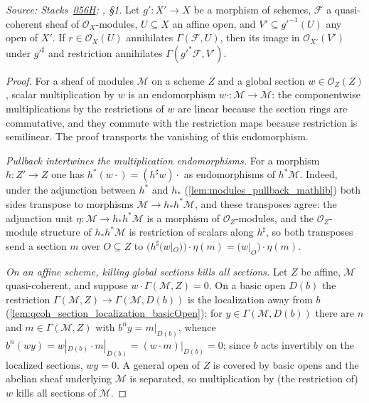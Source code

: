 \begin{lemma}\leanok
  \label{lem:annihilator_pullback_sections}
  \textit{Source:
  Stacks~\href{https://stacks.math.columbia.edu/tag/056H}{056H};
  \cite{nitsure-hilbert-quot}, \S 1.}
  Let \(g' : X' \to X\) be a morphism of schemes, \(\mathcal{F}\) a
  quasi-coherent sheaf of \(\mathcal{O}_X\)-modules, \(U \subseteq X\) an
  affine open, and \(V' \subseteq g'^{-1}(U)\) any open of \(X'\).  If
  \(r \in \mathcal{O}_X(U)\) annihilates \(\Gamma(\mathcal{F}, U)\), then its
  image in \(\mathcal{O}_{X'}(V')\) under \(g'^\sharp\) and restriction
  annihilates \(\Gamma(g'^* \mathcal{F}, V')\).
\end{lemma}
\begin{proof}\leanok
  For a sheaf of modules \(\mathcal{M}\) on a scheme \(Z\) and a global
  section \(w \in \mathcal{O}_Z(Z)\), scalar multiplication by \(w\) is an
  endomorphism \(w \cdot : \mathcal{M} \to \mathcal{M}\): the componentwise
  multiplications by the restrictions of \(w\) are linear because the section
  rings are commutative, and they commute with the restriction maps because
  restriction is semilinear.  The proof transports the vanishing of this
  endomorphism.

  \emph{Pullback intertwines the multiplication endomorphisms.}  For a
  morphism \(h : Z' \to Z\) one has \(h^*(w \cdot) = (h^\sharp w) \cdot\) as
  endomorphisms of \(h^* \mathcal{M}\).  Indeed, under the adjunction between
  \(h^*\) and \(h_*\) (\cref{lem:modules_pullback_mathlib}) both sides
  transpose to morphisms \(\mathcal{M} \to h_* h^* \mathcal{M}\), and these
  transposes agree: the adjunction unit
  \(\eta : \mathcal{M} \to h_* h^* \mathcal{M}\) is a morphism of
  \(\mathcal{O}_Z\)-modules, and the \(\mathcal{O}_Z\)-module structure of
  \(h_* h^* \mathcal{M}\) is restriction of scalars along \(h^\sharp\), so
  both transposes send a section \(m\) over \(O \subseteq Z\) to
  \(\bigl(h^\sharp(w|_O)\bigr) \cdot \eta(m) = \bigl(w|_O\bigr) \cdot
  \eta(m)\).

  \emph{On an affine scheme, killing global sections kills all sections.}
  Let \(Z\) be affine, \(\mathcal{M}\) quasi-coherent, and suppose
  \(w \cdot \Gamma(\mathcal{M}, Z) = 0\).  On a basic open \(D(b)\) the
  restriction \(\Gamma(\mathcal{M}, Z) \to \Gamma(\mathcal{M}, D(b))\) is the
  localization away from \(b\)
  (\cref{lem:qcoh_section_localization_basicOpen}); for
  \(y \in \Gamma(\mathcal{M}, D(b))\) there are \(n\) and
  \(m \in \Gamma(\mathcal{M}, Z)\) with \(b^n y = m|_{D(b)}\), whence
  \(b^n (w y) = w|_{D(b)} \cdot m|_{D(b)} = (w \cdot m)|_{D(b)} = 0\); since
  \(b\) acts invertibly on the localized sections, \(w y = 0\).  A general
  open of \(Z\) is covered by basic opens and the abelian sheaf underlying
  \(\mathcal{M}\) is separated, so multiplication by (the restriction of)
  \(w\) kills all sections of \(\mathcal{M}\).


\end{proof}
